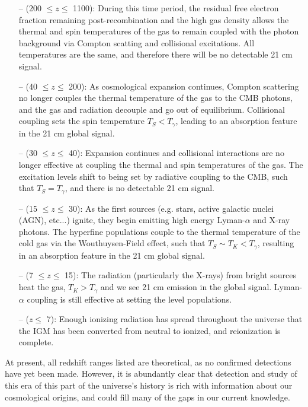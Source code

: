 \begin{itemize}
    \item[--] (200 $\leq z \leq$ 1100): During this time period, the residual 
     free electron fraction remaining post-recombination and the high gas 
     density allows the thermal and spin temperatures of the gas to remain 
     coupled with the photon background via Compton scatting and collisional 
     excitations. All temperatures are the same, and therefore there will be no 
     detectable 21 cm signal.
    \item[--] (40 $\leq z \leq$ 200): As cosmological expansion continues, 
     Compton scattering no longer couples the thermal temperature of the gas to 
     the CMB photons, and the gas and radiation decouple and go out of 
     equilibrium.  Collisional coupling sets the spin temperature $T_S < 
     T_\gamma$, leading to an absorption feature in the 21 cm global signal.  
    \item[--] (30 $\leq z \leq$ 40): Expansion continues and collisional 
     interactions are no longer effective at coupling the thermal and spin 
     temperatures of the gas. The excitation levels shift to being set by 
     radiative coupling to the CMB, such that $T_S = T_\gamma$, and there is no 
     detectable 21 cm signal.
    \item[--] (15 $\leq z \leq$ 30): As the first sources (e.g. stars, active 
     galactic nuclei (AGN), etc...) ignite, they begin emitting high energy 
     Lyman-$\alpha$ and X-ray photons. The hyperfine populations couple to the 
     thermal temperature of the cold gas via the Wouthuysen-Field effect, such 
     that $T_S \sim T_K < T_\gamma$, resulting in an absorption feature in the 
     21 cm global signal.
    \item[--] (7 $\leq z \leq$ 15): The radiation (particularly the X-rays) 
     from bright sources heat the gas, $T_K > T_\gamma$ and we see 21 cm 
     emission in the global signal. Lyman-$\alpha$ coupling is still effective 
     at setting the level populations.
    \item[--] ($z \leq$ 7): Enough ionizing radiation has spread throughout the 
     universe that the IGM has been converted from neutral to ionized, and 
     reionization is complete.
\end{itemize}

At present, all redshift ranges listed are theoretical, as no confirmed 
detections have yet been made. However, it is abundantly clear that detection 
and study of this era of this part of the universe's history is rich with 
information about our cosmological origins, and could fill many of the gaps in 
our current knowledge.
